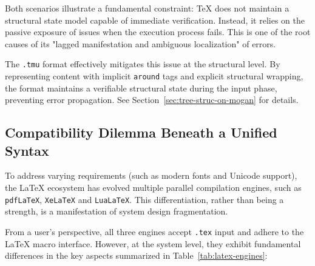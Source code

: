 Both scenarios illustrate a fundamental constraint: \TeX{} does not maintain a structural state model capable of immediate verification. Instead, it relies on the passive exposure of issues when the execution process fails. This is one of the root causes of its "lagged manifestation and ambiguous localization" of errors.

\begin{remark}
  The \texttt{.tmu} format effectively mitigates this issue at the structural level. By representing content with implicit \texttt{around} tags and explicit structural wrapping, the format maintains a verifiable structural state during the input phase, preventing error propagation. See Section~\ref{sec:tree-struc-on-mogan} for details.
\end{remark}

\subsection{Compatibility Dilemma Beneath a Unified Syntax}

To address varying requirements (such as modern fonts and Unicode support), the \LaTeX{} ecosystem has evolved multiple parallel compilation engines, such as \texttt{pdfLaTeX}, \texttt{XeLaTeX} and \texttt{LuaLaTeX}. This differentiation, rather than being a strength, is a manifestation of system design fragmentation.

From a user's perspective, all three engines accept \texttt{.tex} input and adhere to the \LaTeX{} macro interface. However, at the system level, they exhibit fundamental differences in the key aspects summarized in Table~\ref{tab:latex-engines}:

\begin{table}[htbp]
  \centering
  \caption{Comparison of \LaTeX{} Engines}
  \label{tab:latex-engines}
\end{table}

